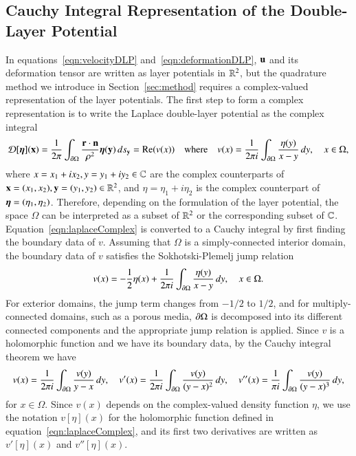 \documentclass[preprint,10pt]{elsarticle}
\begin{document}
\subsection{Cauchy Integral Representation of the Double-Layer
Potential}
\label{sec:DLPcomplex}
In equations~\eqref{eqn:velocityDLP} and~\eqref{eqn:deformationDLP},
${\mathbf{u}}$ and its deformation tensor are written as layer potentials in
${\mathbb{R}}^2$, but the quadrature method we introduce in
Section~\ref{sec:method} requires a complex-valued representation of the
layer potentials. The first step to form a complex representation is to
write the Laplace double-layer potential as the complex integral
\begin{align}
  {\mathcal{D}}[{\boldsymbol\eta}]({\mathbf{x}}) = \frac{1}{2\pi} \int_{{\partial}\Omega} 
    \frac{{\mathbf{r}} \cdot {\mathbf{n}}}{\rho^2}{\boldsymbol\eta}({\mathbf{y}})\, ds_{\mathbf{y}} = {\operatorname{Re}} (v(x)) \quad 
    \text{where} \quad v(x) = \frac{1}{2\pi i} \int_{{\partial}\Omega}
    \frac{\eta(y)}{x - y} \, dy, \quad x \in \Omega,
  \label{eqn:laplaceComplex}
\end{align}
where $x = x_1 + i x_2,y = y_1 + i y_2 \in {\mathbb{C}}$ are the complex
counterparts of ${\mathbf{x}} = (x_1,x_2),{\mathbf{y}} = (y_1,y_2) \in {\mathbb{R}}^2$, and $\eta =
\eta_1 + i \eta_2$ is the complex counterpart of ${\boldsymbol\eta} =
(\eta_1,\eta_2)$. Therefore, depending on the formulation of the layer
potential, the space $\Omega$ can be interpreted as a subset of ${\mathbb{R}}^2$
or the corresponding subset of ${\mathbb{C}}$.
Equation~\eqref{eqn:laplaceComplex} is converted to a Cauchy integral by
first finding the boundary data of $v$.  Assuming that $\Omega$ is a
simply-connected interior domain, the boundary data of $v$ satisfies the
Sokhotski-Plemelj jump relation
\begin{align}
  \label{eqn:SPrelation}
  v(x) = - \frac{1}{2} \eta(x) + \frac{1}{2\pi i} \int_{{\partial}\Omega}
    \frac{\eta(y)}{x-y}\, dy, \quad x \in \Omega.
\end{align}
For exterior domains, the jump term changes from $-1/2$ to $1/2$, and
for multiply-connected domains, such as a porous media, ${\partial}\Omega$ is
decomposed into its different connected components and the appropriate
jump relation is applied.  Since $v$ is a holomorphic function and we
have its boundary data, by the Cauchy integral theorem we have
\begin{align}
  \label{eqn:cauchy}
  v(x) = \frac{1}{2\pi i}\int_{{\partial}\Omega} 
    \frac{v(y)}{y-x} \,dy, \quad
  v'(x) = \frac{1}{2\pi i} \int_{{\partial}\Omega}
    \frac{v(y)}{(y-x)^2} \, dy, \quad
  v''(x) = \frac{1}{\pi i} \int_{{\partial}\Omega}
    \frac{v(y)}{(y-x)^3} \, dy,
\end{align}
for $x \in \Omega$.  Since $v(x)$ depends on the complex-valued density
function $\eta$, we use the notation $v[\eta](x)$ for the holomorphic
function defined in equation~\eqref{eqn:laplaceComplex}, and its first
two derivatives are written as $v'[\eta](x)$ and $v''[\eta](x)$.  
  
\end{document}
